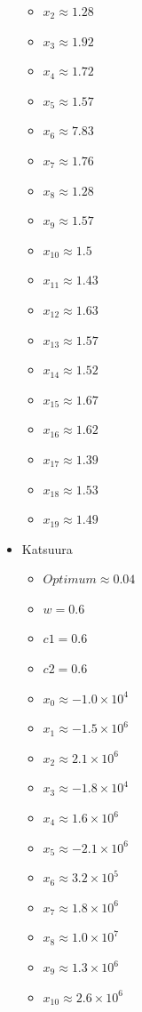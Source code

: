 \documentclass[hidelinks,english,conference]{IEEEtran}
\begin{document}
\begin{itemize}
\begin{itemize}
			\item $x_{2} \approx 1.28$
			\item $x_{3} \approx 1.92$
			\item $x_{4} \approx 1.72$
			\item $x_{5} \approx 1.57$
			\item $x_{6} \approx 7.83$
			\item $x_{7} \approx 1.76$
			\item $x_{8} \approx 1.28$
			\item $x_{9} \approx 1.57$
			\item $x_{10} \approx 1.5$
			\item $x_{11} \approx 1.43$
			\item $x_{12} \approx 1.63$
			\item $x_{13} \approx 1.57$
			\item $x_{14} \approx 1.52$
			\item $x_{15} \approx 1.67$
			\item $x_{16} \approx 1.62$
			\item $x_{17} \approx 1.39$
			\item $x_{18} \approx 1.53$
			\item $x_{19} \approx 1.49$
		\end{itemize}
	\item Katsuura\\
		\begin{itemize}
			\item $Optimum \approx 0.04$
			\item $w = 0.6$
			\item $c1 = 0.6$
			\item $c2 = 0.6$
			\item $x_{0} \approx -1.0 \times 10^{4}$
			\item $x_{1} \approx -1.5 \times 10^{6}$
			\item $x_{2} \approx 2.1 \times 10^{6}$
			\item $x_{3} \approx -1.8 \times 10^{4}$
			\item $x_{4} \approx 1.6 \times 10^{6}$
			\item $x_{5} \approx -2.1 \times 10^{6}$
			\item $x_{6} \approx 3.2 \times 10^{5}$
			\item $x_{7} \approx 1.8 \times 10^{6}$
			\item $x_{8} \approx 1.0 \times 10^{7}$
			\item $x_{9} \approx 1.3 \times 10^{6}$
			\item $x_{10} \approx 2.6 \times 10^{6}$

\end{itemize}
\end{itemize}
\end{document}
